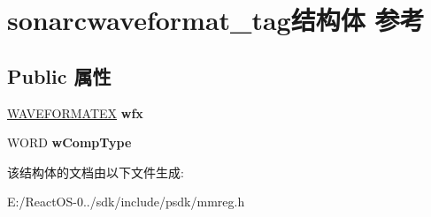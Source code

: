\hypertarget{structsonarcwaveformat__tag}{}\section{sonarcwaveformat\+\_\+tag结构体 参考}
\label{structsonarcwaveformat__tag}
\subsection*{Public 属性}
\begin{DoxyCompactItemize}
\item 
\mbox{\label{structsonarcwaveformat__tag_a807ecd6030f22a95835092b833e1fa2a}} 
\hyperlink{struct_w_a_v_e_f_o_r_m_a_t_e_x}{W\+A\+V\+E\+F\+O\+R\+M\+A\+T\+EX} {\bfseries wfx}
\item 
\mbox{\label{structsonarcwaveformat__tag_aea64056b248c50e33ea913bd7d44b0ea}} 
W\+O\+RD {\bfseries w\+Comp\+Type}
\end{DoxyCompactItemize}


该结构体的文档由以下文件生成\+:\begin{DoxyCompactItemize}
\item 
E\+:/\+React\+O\+S-\/0../sdk/include/psdk/mmreg.\+h\end{DoxyCompactItemize}
